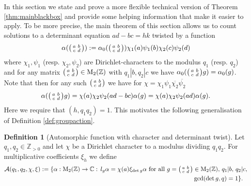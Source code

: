 \documentclass[12pt]{amsart}
\theoremstyle{definition}
\newtheorem{definition}{Definition}
\theoremstyle{remark}
\numberwithin{equation}{section}
\newcommand{\C}{{\mathbb C}}
\newcommand{\Z}{{\mathbb Z}}
\newcommand{\1}{{\mathbf 1}}
\newcommand{\MM}{\operatorname{M}}
\begin{document}
In this section we state and prove a more flexible technical version of Theorem \ref{thm:mainblackbox} and provide some helping information that make it easier to apply. To be more precise, the main theorem of this section allows us to count solutions to a determinant equation $ad-bc=hk$ twisted by a function
\begin{align*}
  \alpha(\smqty(a & b \\ c& d)):= \alpha_0(\smqty(a & b \\ c& d)) \chi_1(a) \psi_1(b) \chi_2(c) \psi_2 (d)
\end{align*}
where  $\chi_1,\psi_1$ (resp. $\chi_2,\psi_2$) are Dirichlet-characters to the modulus $q_1$ (resp. $q_2$) and for any matrix $\smqty(a & b \\ c & d) \in \MM_2(\Z)$ with $q_1| b,q_2 | c$ we have $\alpha_0(\smqty(a & b \\ c& d) g) = \alpha_0(g)$. Note that then for any such $\smqty(a & b \\ c & d)$  we have for $\chi= \chi_1 \psi_1 \overline{\chi_2} \overline{\psi_2}$
\begin{align*}
      \alpha(\smqty(a & b \\ c& d) g ) = \chi(a) \chi_2\psi_2(ad- bc) \alpha(g) =  \chi(a) \chi_2\psi_2(ad) \alpha(g).
\end{align*}
Here we require that $(h,q_1 q_2)=1$. This motivates the following generalisation of Definition \ref{def:groupaction}.
\begin{definition}[Automorphic function with character and determinant twist]\label{def:autfunctionchi}
Let $q_1,q_2 \in \Z_{>0}$ and let $\chi$ be a Dirichlet character to a modulus dividing $q_1q_2$. For multiplicative coefficients $\xi_h$ we define
\begin{align*} 
    \mathcal{A}(q_1,q_2,\chi,\xi):= \{\alpha:\MM_2(\Z) \to \C: \, l_g \alpha = \chi(a) \xi_{\det g} \alpha \,\, \text{for all} \,\, g=\smqty(a & b \\ c& d)& \in \MM_{2}(\Z), \, q_1 | b, \, q_2 |c,  \\
    &\gcd(\det g,q)=1 \}.
\end{align*}
\end{definition}
\end{document}
